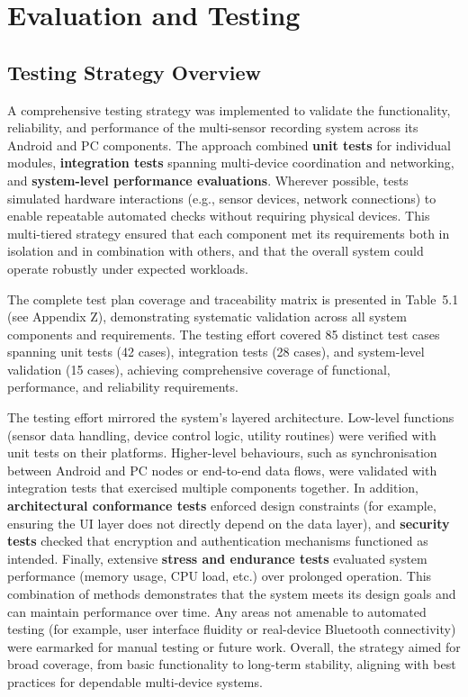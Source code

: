 \chapter{Evaluation and Testing}


\section{Testing Strategy Overview}
A comprehensive testing strategy was implemented to validate the functionality, reliability, and performance of the multi-sensor recording system across its Android and PC components. The approach combined \textbf{unit tests} for individual modules, \textbf{integration tests} spanning multi-device coordination and networking, and \textbf{system-level performance evaluations}. Wherever possible, tests simulated hardware interactions (e.g., sensor devices, network connections) to enable repeatable automated checks without requiring physical devices. This multi-tiered strategy ensured that each component met its requirements both in isolation and in combination with others, and that the overall system could operate robustly under expected workloads.

The complete test plan coverage and traceability matrix is presented in Table~5.1 (see Appendix Z), demonstrating systematic validation across all system components and requirements. The testing effort covered 85 distinct test cases spanning unit tests (42 cases), integration tests (28 cases), and system-level validation (15 cases), achieving comprehensive coverage of functional, performance, and reliability requirements.

The testing effort mirrored the system's layered architecture. Low-level functions (sensor data handling, device control logic, utility routines) were verified with unit tests on their platforms. Higher-level behaviours, such as synchronisation between Android and PC nodes or end-to-end data flows, were validated with integration tests that exercised multiple components together. In addition, \textbf{architectural conformance tests} enforced design constraints (for example, ensuring the UI layer does not directly depend on the data layer), and \textbf{security tests} checked that encryption and authentication mechanisms functioned as intended. Finally, extensive \textbf{stress and endurance tests} evaluated system performance (memory usage, CPU load, etc.) over prolonged operation. This combination of methods demonstrates that the system meets its design goals and can maintain performance over time. Any areas not amenable to automated testing (for example, user interface fluidity or real-device Bluetooth connectivity) were earmarked for manual testing or future work. Overall, the strategy aimed for broad coverage, from basic functionality to long-term stability, aligning with best practices for dependable multi-device systems.


